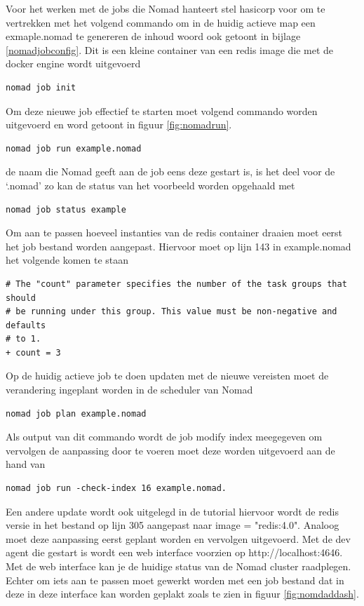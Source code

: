Voor het werken met de jobs die Nomad hanteert stel hasicorp voor om te vertrekken met het volgend commando om in de huidig actieve map een exmaple.nomad te genereren de inhoud woord ook getoont in bijlage \ref{nomadjobconfig}. Dit is een kleine container van een redis image die met de docker engine wordt uitgevoerd
\begin{verbatim}
nomad job init
\end{verbatim}
Om deze nieuwe job effectief te starten moet volgend commando worden uitgevoerd en word getoont in figuur \ref{fig:nomadrun}.
\begin{verbatim}
nomad job run example.nomad
\end{verbatim}
de naam die Nomad geeft aan de job eens deze gestart is, is het deel voor de ‘.nomad’ zo kan de status van het voorbeeld worden opgehaald met
\begin{verbatim}
nomad job status example
\end{verbatim}
Om aan te passen hoeveel instanties van de redis container draaien moet eerst het job bestand worden aangepast. Hiervoor moet op lijn 143 in example.nomad het volgende komen te staan
\begin{verbatim}
# The "count" parameter specifies the number of the task groups that should
# be running under this group. This value must be non-negative and defaults
# to 1.
+ count = 3
\end{verbatim}
Op de huidig actieve job te doen updaten met de nieuwe vereisten moet de verandering ingeplant worden in de scheduler van Nomad
\begin{verbatim}
nomad job plan example.nomad
\end{verbatim}
Als output van dit commando wordt de job modify index meegegeven om vervolgen de aanpassing door te voeren moet deze worden uitgevoerd aan de hand van
\begin{verbatim}
nomad job run -check-index 16 example.nomad.
\end{verbatim}
Een andere update wordt ook uitgelegd in de tutorial hiervoor wordt de redis versie in het bestand op lijn 305 aangepast naar image = "redis:4.0". Analoog moet deze aanpassing eerst geplant worden en vervolgen uitgevoerd.
Met de dev agent die gestart is wordt een web interface voorzien op http://localhost:4646. Met de web interface kan je de huidige status van de Nomad cluster raadplegen. Echter om iets aan te passen moet gewerkt worden met een job bestand dat in deze in deze interface kan worden geplakt zoals te zien in figuur \ref{fig:nomdaddash}.

